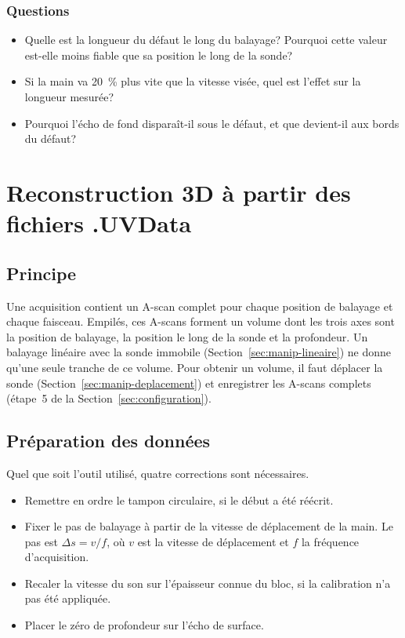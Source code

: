 \documentclass[11pt,letterpaper]{article}
\begin{document}
\subsubsection*{Questions}

\begin{itemize}
  \item Quelle est la longueur du d\'efaut le long du balayage? Pourquoi cette valeur est-elle moins fiable que sa position le long de la sonde?
  \item Si la main va 20~\% plus vite que la vitesse vis\'ee, quel est l'effet sur la longueur mesur\'ee?
  \item Pourquoi l'\'echo de fond dispara\^it-il sous le d\'efaut, et que devient-il aux bords du d\'efaut?
\end{itemize}

\section{Reconstruction 3D \`a partir des fichiers .UVData}
\label{sec:reconstruction}

\subsection{Principe}

Une acquisition contient un A-scan complet pour chaque position de balayage et chaque faisceau. Empil\'es, ces A-scans forment un volume dont les trois axes sont la position de balayage, la position le long de la sonde et la profondeur. Un balayage lin\'eaire avec la sonde immobile (Section~\ref{sec:manip-lineaire}) ne donne qu'une seule tranche de ce volume. Pour obtenir un volume, il faut d\'eplacer la sonde (Section~\ref{sec:manip-deplacement}) et enregistrer les A-scans complets (\'etape~5 de la Section~\ref{sec:configuration}).

\subsection{Pr\'eparation des donn\'ees}

Quel que soit l'outil utilis\'e, quatre corrections sont n\'ecessaires.

\begin{itemize}
  \item Remettre en ordre le tampon circulaire, si le d\'ebut a \'et\'e r\'e\'ecrit.
  \item Fixer le pas de balayage \`a partir de la vitesse de d\'eplacement de la main. Le pas est $\Delta s = v / f$, o\`u $v$ est la vitesse de d\'eplacement et $f$ la fr\'equence d'acquisition.
  \item Recaler la vitesse du son sur l'\'epaisseur connue du bloc, si la calibration n'a pas \'et\'e appliqu\'ee.
  \item Placer le z\'ero de profondeur sur l'\'echo de surface.
\end{itemize}
\end{document}
